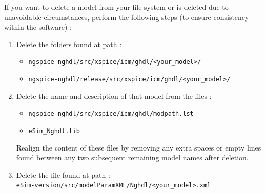If you want to delete a model from your file system or is deleted due to unavoidable circumstances, perform the following steps (to ensure consistency within the software) :
\begin{enumerate}
    \item Delete the folders found at path :
    \begin{itemize}
        \begin{itemize}
        \item
        \texttt{ngspice-nghdl/src/xspice/icm/ghdl/<your\_model>/} 
        \item \texttt{ngspice-nghdl/release/src/xspice/icm/ghdl/<your\_model>/}
        \end{itemize}
    \end{itemize}
    \item Delete the name and description of that model from the files :
    \begin{itemize}
        \begin{itemize}
        \item
     \texttt{ngspice-nghdl/src/xspice/icm/ghdl/modpath.lst}
     \item  \texttt{eSim\_Nghdl.lib}
     \end{itemize}
    \end{itemize}
    
     Realign the content of these files by            removing any extra spaces or empty lines found between any two subsequent remaining         model names after deletion.
    
    \item Delete the file found at path : \\
    \texttt{eSim-version/src/modelParamXML/Nghdl/<your\_model>.xml}
    

\end{enumerate}
